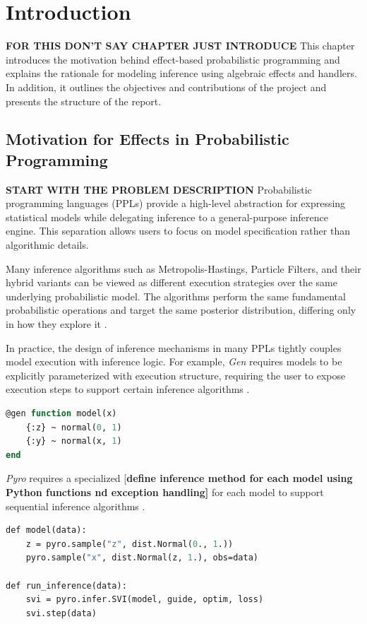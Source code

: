 \documentclass[logo,bsc,singlespacing,parskip,online]{infthesis}
\begin{document}
\chapter{Introduction}


\textbf{FOR THIS DON'T SAY CHAPTER JUST INTRODUCE}
This chapter introduces the motivation behind effect-based probabilistic programming and explains the rationale for modeling inference using algebraic effects and handlers. In addition, it outlines the objectives and contributions of the project and presents the structure of the report.

\section{Motivation for Effects in Probabilistic Programming}

\textbf{START WITH THE PROBLEM DESCRIPTION}
Probabilistic programming languages (PPLs) provide a high-level abstraction for expressing statistical models while delegating inference to a general-purpose inference engine. This separation allows users to focus on model specification rather than algorithmic details. 

Many inference algorithms such as Metropolis-Hastings, Particle Filters, and their hybrid variants can be viewed as different execution strategies over the same underlying probabilistic model. The algorithms perform the same fundamental probabilistic operations and target the same posterior distribution, differing only in how they explore it \citep{ProbFX}.

In practice, the design of inference mechanisms in many PPLs tightly couples model execution with inference logic. For example, \textit{Gen} requires models to be explicitly parameterized with execution structure, requiring the user to expose execution steps to support certain inference algorithms \citep{Gen}.


\begin{lstlisting}[language=OCaml]
@gen function model(x) 
    {:z} ~ normal(0, 1) 
    {:y} ~ normal(x, 1) 
end 
\end{lstlisting}


\textit{Pyro} requires a specialized [\textbf{define inference method for each model using Python functions nd exception handling]} for each model to support sequential inference algorithms \citep{Pyro}. 

\begin{lstlisting}[language=OCaml]
def model(data): 
    z = pyro.sample("z", dist.Normal(0., 1.)) 
    pyro.sample("x", dist.Normal(z, 1.), obs=data) 

def run_inference(data): 
    svi = pyro.infer.SVI(model, guide, optim, loss) 
    svi.step(data)
\end{lstlisting}
\end{document}
